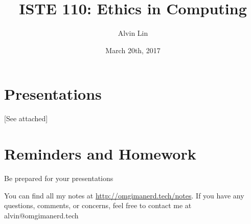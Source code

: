 \documentclass[letterpaper, 12pt]{article}
\title{ISTE 110: Ethics in Computing}
\author{Alvin Lin}
\date{March 20th, 2017}
\begin{document}
\maketitle

\section*{Presentations}
[See attached]

\section*{Reminders and Homework}
Be prepared for your presentations

\begin{center}
  You can find all my notes at \url{http://omgimanerd.tech/notes}. If you have
  any questions, comments, or concerns, feel free to contact me at
  alvin@omgimanerd.tech
\end{center}
\end{document}
